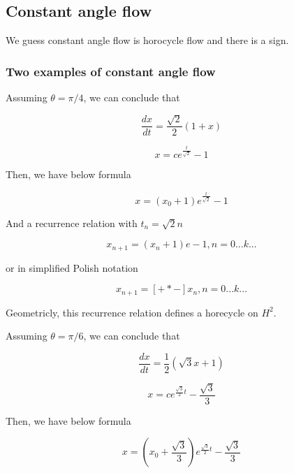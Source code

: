\documentclass{article}
\begin{document}
\subsection{Constant angle flow}

We guess constant angle flow is horocycle flow and there is a sign.

\subsubsection{Two examples of constant angle flow}

Assuming $\theta = \pi / 4$, we can conclude that

\begin{equation}
    \frac{dx}{dt} = \frac{\sqrt{2}}{2} (1 + x)
\end{equation}

\begin{equation}
    x = c e^{\frac{t}{\sqrt{2}}} - 1
\end{equation}

Then, we have below formula

\begin{equation}
    x = (x_0 + 1)e^{\frac{t}{\sqrt{2}}} - 1
\end{equation}

And a recurrence relation with $t_n = \sqrt{2} n$

\begin{equation}
    x_{n+1} = (x_n + 1) e - 1, n = 0 ... k ...
\end{equation}

or in simplified Polish notation

\begin{equation}
    x_{n+1} = [+*-] x_n, n = 0 ... k ...
\end{equation}

Geometricly, this recurrence relation defines a horecycle on $H^2$.

Assuming $\theta = \pi / 6$, we can conclude that

\begin{equation}
    \frac{dx}{dt} = \frac{1}{2} (\sqrt{3} x + 1)
\end{equation}

\begin{equation}
    x = c e^{\frac{\sqrt{3}}{2}t} - \frac{\sqrt{3}}{3}
\end{equation}

Then, we have below formula

\begin{equation}
    x = (x_0 + \frac{\sqrt{3}}{3})e^{\frac{\sqrt{3}}{2}t} - \frac{\sqrt{3}}{3}
\end{equation}
\end{document}

